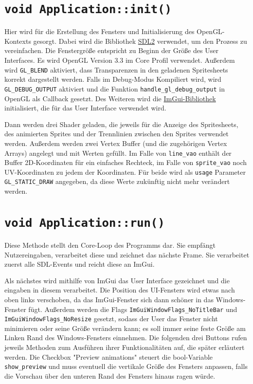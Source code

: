 \section{\lstinline{void Application::init()}}
Hier wird für die Erstellung des Fensters und Initialisierung des OpenGL-Kontexts gesorgt. Dabei wird die Bibliothek \href{https://www.libsdl.org/}{SDL2} verwendet, um den Prozess zu vereinfachen. Die Fenstergröße entspricht zu Beginn der Größe des User Interfaces. Es wird OpenGL Version 3.3 im Core Profil verwendet. Außerdem wird \lstinline{GL_BLEND} aktiviert, dass Trans­pa­renzen in den geladenen Spritesheets korrekt dargestellt werden. Falls im Debug-Modus Kompiliert wird, wird \lstinline{GL_DEBUG_OUTPUT} aktiviert und die Funktion \lstinline{handle_gl_debug_output} in OpenGL als Callback gesetzt. Des Weiteren wird die \href{https://github.com/ocornut/imgui}{ImGui-Bibliothek} initialisiert, die für das User Interface verwendet wird. 

Dann werden drei Shader geladen, die jeweils für die Anzeige des Spritesheets, des animierten Sprites und der Trennlinien zwischen den Sprites verwendet werden. Außerdem werden zwei Vertex Buffer (und die zugehörigen Vertex Arrays) angelegt und mit Werten gefüllt. Im Falle von \lstinline{line_vao} enthält der Buffer 2D-Koordinaten für ein einfaches Rechteck, im Falle von \lstinline{sprite_vao} noch UV-Koordinaten zu jedem der Koordinaten. Für beide wird als \lstinline{usage} Parameter \lstinline{GL_STATIC_DRAW} angegeben, da diese Werte zukünftig nicht mehr verändert werden. 

\section{\lstinline{void Application::run()}}
Diese Methode stellt den Core-Loop des Programms dar. Sie empfängt Nutzereingaben, verarbeitet diese und zeichnet das nächste Frame. Sie verarbeitet zuerst alle SDL-Events und reicht diese an ImGui.

Als nächstes wird mithilfe von ImGui das User Interface gezeichnet und die eingaben in diesem verarbeitet. Die Position des UI-Fensters wird etwas nach oben links verschoben, da das ImGui-Fenster sich dann schöner in das Windows-Fenster fügt. Außerdem werden die Flags \lstinline{ImGuiWindowFlags_NoTitleBar} und \lstinline{ImGuiWindowFlags_NoResize} gesetzt, sodass der User das Fenster nicht minimieren oder seine Größe verändern kann; es soll immer seine feste Größe am Linken Rand des Windows-Fensters einnehmen. Die folgenden drei Buttons rufen jeweils Methoden zum Ausführen ihrer Funktionalitäten auf, die später erläutert werden. Die Checkbox "Preview animations" steuert die bool-Variable \lstinline{show_preview} und muss eventuell die vertikale Größe des Fensters anpassen, falls die Vorschau über den unteren Rand des Fensters hinaus ragen würde.

